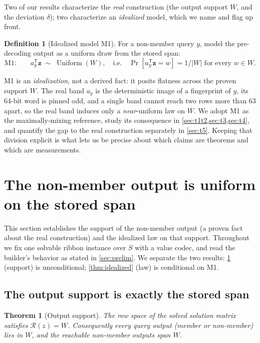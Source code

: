 \documentclass[11pt]{article}
\theoremstyle{definition}
\newtheorem{definition}{Definition}[section]
\theoremstyle{plain}
\newtheorem{theorem}{Theorem}[section]
\theoremstyle{remark}
\DeclareMathOperator{\Uniform}{Uniform}
\newcommand{\W}{W}                          %
\newcommand{\Rz}{\mathcal{R}(z)}            %
\newcommand{\bz}{\mathbf{z}}                %
\newcommand{\ay}{a_y}                       %
\begin{document}
Two of our results characterize the \emph{real} construction (the output support
$\W$, and the deviation $\delta$); two characterize an \emph{idealized} model, which
we name and flag up front.
\begin{definition}[Idealized model M1]
\label{def:M1}
For a non-member query $y$, model the pre-decoding output as a uniform draw from the
stored span:
\[
  \text{M1:}\qquad \ay^{\mathsf T}\bz \;\sim\; \Uniform(\W),
  \quad\text{i.e.}\quad
  \Pr[\ay^{\mathsf T}\bz = w] = 1/|\W| \text{ for every } w \in \W.
\]
\end{definition}
M1 is an \emph{idealization}, not a derived fact: it posits flatness across the
proven support $\W$. The real band $\ay$ is the deterministic image of a fingerprint
of $y$, its $64$-bit word is pinned odd, and a single band cannot reach two rows more
than $63$ apart, so the real band induces only a \emph{near}-uniform law on $\W$.
We adopt M1 as the maximally-mixing reference, study its consequence in
\cref{sec:t1t2,sec:t3,sec:t4}, and quantify the gap to the real construction
separately in \cref{sec:t5}. Keeping that division explicit is what lets us be precise
about which claims are theorems and which are measurements.

\section{The non-member output is uniform on the stored span}
\label{sec:t1t2}

This section establishes the support of the non-member output (a proven fact about
the real construction) and the idealized law on that support. Throughout we fix one
solvable ribbon instance over $S$ with a value codec, and read the builder's behavior
as stated in \cref{sec:prelim}. We separate the two results: \cref{thm:support}
(support) is unconditional; \cref{thm:idealized} (law) is conditional on M1.

\subsection{The output support is exactly the stored span}

\begin{theorem}[Output support]
\label{thm:support}
The row space of the solved solution matrix satisfies $\Rz = \W$. Consequently every
query output (member or non-member) lies in $\W$, and the reachable non-member outputs
span $\W$.
\end{theorem}
\end{document}
